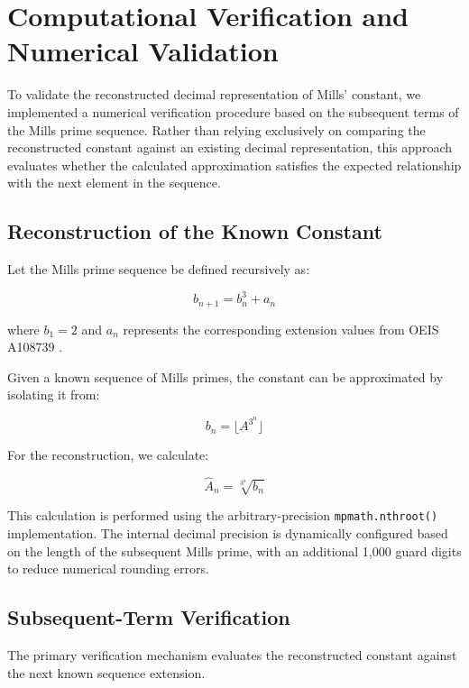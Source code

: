 \documentclass{article}
\begin{document}
\section{Computational Verification and Numerical Validation}

To validate the reconstructed decimal representation of Mills' constant, we implemented a numerical verification procedure based on the subsequent terms of the Mills prime sequence. Rather than relying exclusively on comparing the reconstructed constant against an existing decimal representation, this approach evaluates whether the calculated approximation satisfies the expected relationship with the next element in the sequence.

\subsection{Reconstruction of the Known Constant}

Let the Mills prime sequence be defined recursively as:

\begin{equation}
    b_{n+1} = b_n^3 + a_n
\end{equation}

where $b_1 = 2$ and $a_n$ represents the corresponding extension values from OEIS A108739 \cite{oeisA108739}.

Given a known sequence of Mills primes, the constant can be approximated by isolating it from:

\begin{equation}
    b_n = \lfloor A^{3^n} \rfloor
\end{equation}

For the reconstruction, we calculate:

\begin{equation}
    \widehat{A}_n = \sqrt[3^n]{b_n}
\end{equation}

This calculation is performed using the arbitrary-precision \texttt{mpmath.nthroot()} implementation. The internal decimal precision is dynamically configured based on the length of the subsequent Mills prime, with an additional 1,000 guard digits to reduce numerical rounding errors.

\subsection{Subsequent-Term Verification}

The primary verification mechanism evaluates the reconstructed constant against the next known sequence extension.
\end{document}
